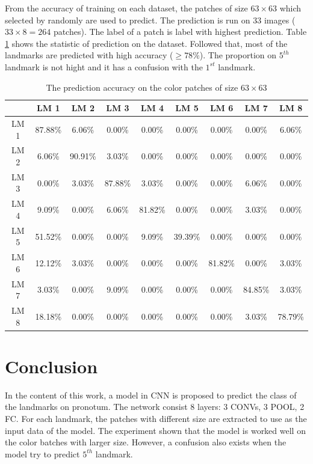 From the accuracy of training on each dataset, the patches of size $63\times63$ which selected by randomly are used to predict. The prediction is run on $33$ images ($33 \times 8 = 264$ patches). The label of a patch is label with highest prediction. Table \ref{tb4} shows the statistic of prediction on the dataset. Followed that, most of the landmarks are predicted with high accuracy ($\geq 78\%$). The proportion on $5^{th}$ landmark is not hight and it has a confusion with the $1^{st}$ landmark.
\begin{table}
	\centering
	\begin{tabular}{*{9}{c}}
		& LM 1 & LM 2 & LM 3 & LM 4 & LM 5 & LM 6 & LM 7 & LM 8 \\ \hline
		LM 1 & 87.88\% & 	6.06\% &	 0.00\% &	0.00\% & 	0.00\% & 	0.00\% & 	0.00\%	& 6.06\% \\ \hline
		LM 2 &	6.06\% &	 	90.91\% &	3.03\% & 	0.00\% & 	0.00\% & 	0.00\% & 	0.00\% & 	0.00\% \\ \hline
	LM 3 &	0.00\% & 	3.03\% & 	87.88\% &	3.03\% & 	0.00\% & 	0.00\% & 	6.06\% & 	0.00\% \\ \hline
	LM 4	 & 9.09\% &	0.00\% & 	6.06\% & 	81.82\% &	0.00\% & 	0.00\% & 	3.03\% & 	0.00\% \\ \hline
	LM 5	 & 51.52\% &	0.00\%	& 0.00\%	 & 9.09\% &	39.39\%	& 0.00\%	 & 0.00\% &	0.00\% \\ \hline
	LM 6	 & 12.12\%	& 3.03\%	 & 0.00\% &	0.00\% & 	0.00\% & 	81.82\% &	0.00\% & 	3.03\% \\ \hline
	LM 7	 & 3.03\%	& 0.00\%	 & 9.09\%	& 0.00\%	 & 0.00\%	& 0.00\%	 & 84.85\% &	3.03\% \\ \hline
	LM 8	 & 18.18\%	& 0.00\% &	0.00\%	& 0.00\%	 & 0.00\%	& 0.00\% &	3.03\% &	78.79\% \\ \hline

	\end{tabular}
	\caption{The prediction accuracy on the color patches of size $63\times63$}
	\label{tb4}
\end{table}
\section{Conclusion}
In the content of this work, a model in CNN is proposed to predict the class of the landmarks on pronotum. The network consist 8 layers: 3 CONVs, 3 POOL, 2 FC. For each landmark, the patches with different size are extracted to use as the input data of the model. The experiment shown that the model is worked well on the color batches with larger size. However, a confusion also exists when the model try to predict $5^{th}$ landmark.
